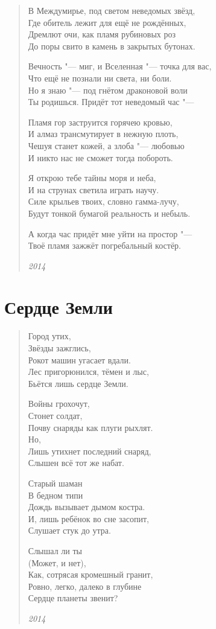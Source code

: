 \documentclass[a4paper,12pt]{article}
\newcommand{\ldotst}{\so{...}\xspace}
\begin{document}
\begin{verse}
В Междумирье, под светом неведомых звёзд,\\
Где обитель лежит для ещё не рождённых,\\
Дремлют очи, как пламя рубиновых роз\\
До поры свито в камень в закрытых бутонах.

Вечность "--- миг, и Вселенная "--- точка для вас,\\
Что ещё не познали ни света, ни боли.\\
Но я знаю "--- под гнётом драконовой воли\\
Ты родишься. Придёт тот неведомый час "---

Пламя гор заструится горячею кровью,\\
И алмаз трансмутирует в нежную плоть,\\
Чешуя станет кожей, а злоба "--- любовью\ldotst\\
И никто нас не сможет тогда побороть.

Я открою тебе тайны моря и неба,\\
И на струнах светила играть научу.\\
Силе крыльев твоих, словно гамма-лучу,\\
Будут тонкой бумагой реальность и небыль.

А когда час придёт мне уйти на простор "---\\
Твоё пламя зажжёт погребальный костёр.

\emph{2014}
\end{verse}
\newpage

\section{Сердце Земли}

\begin{verse}
Город утих,\\
Звёзды зажглись,\\
Рокот машин угасает вдали.\\
Лес пригорюнился, тёмен и лыс,\\
Бьётся лишь сердце Земли.

Войны грохочут,\\
Стонет солдат,\\
Почву снаряды как плуги рыхлят.\\
Но,\\
Лишь утихнет последний снаряд,\\
Слышен всё тот же набат.

Старый шаман\\
В бедном типи\\
Дождь вызывает дымом костра.\\
И, лишь ребёнок во сне засопит,\\
Слушает стук до утра.

Слышал ли ты\\
(Может, и нет),\\
Как, сотрясая кромешный гранит,\\
Ровно, легко, далеко в глубине\\
Сердце планеты звенит?

\emph{2014}
\end{verse}
\newpage
\end{document}
